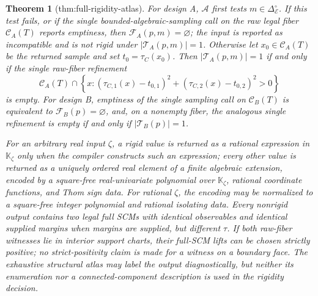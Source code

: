 \documentclass{article}
\newtheorem{theorem}{Theorem}
\begin{document}
\begin{theorem}[thm:full-rigidity-atlas]\label{thm:full-rigidity-atlas}
For design A, \(\mathscr A\) first tests \(m\in\Delta_{\mathcal E}^{\circ}\).  If this test fails, or if the single bounded-algebraic-sampling call on the raw legal fiber \(\mathcal C_A(T)\) reports emptiness, then \(\mathcal F_A(p,m)=\varnothing\); the input is reported as incompatible and is not rigid under \(|\mathcal T_A(p,m)|=1\).  Otherwise let \(x_0\in\mathcal C_A(T)\) be the returned sample and set \(t_0=\tau_C(x_0)\).  Then \(|\mathcal T_A(p,m)|=1\) if and only if the single raw-fiber refinement
\[
\mathcal C_A(T)\cap\left\{x:
(\tau_{C,1}(x)-t_{0,1})^2+(\tau_{C,2}(x)-t_{0,2})^2>0
\right\}
\]
is empty.  For design B, emptiness of the single sampling call on \(\mathcal C_B(T)\) is equivalent to \(\mathcal F_B(p)=\varnothing\), and, on a nonempty fiber, the analogous single refinement is empty if and only if \(|\mathcal T_B(p)|=1\).

For an arbitrary real input \(\zeta\), a rigid value is returned as a rational expression in \(\mathbb K_{\zeta}\) only when the compiler constructs such an expression; every other value is returned as a uniquely ordered real element of a finite algebraic extension, encoded by a square-free real-univariate polynomial over \(\mathbb K_{\zeta}\), rational coordinate functions, and Thom sign data.  For rational \(\zeta\), the encoding may be normalized to a square-free integer polynomial and rational isolating data.  Every nonrigid output contains two legal full SCMs with identical observables and identical supplied margins when margins are supplied, but different \(\tau\).  If both raw-fiber witnesses lie in interior support charts, their full-SCM lifts can be chosen strictly positive; no strict-positivity claim is made for a witness on a boundary face.  The exhaustive structural atlas may label the output diagnostically, but neither its enumeration nor a connected-component description is used in the rigidity decision.
\end{theorem}
\end{document}
